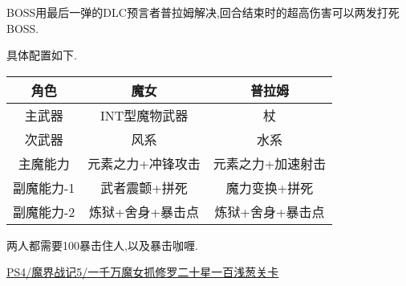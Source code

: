 	BOSS用最后一弹的DLC预言者普拉姆解决,回合结束时的超高伤害可以两发打死BOSS.

	具体配置如下.

	\begin{center}
		\begin{tabular}
		{| c | c | c |}
		\hline
		角色 & 魔女 & 普拉姆\\
		\hline
		主武器 & INT型魔物武器 & 杖\\
		\hline
		次武器 & 风系 & 水系 \\
		\hline
		主魔能力 & 元素之力+冲锋攻击 & 元素之力+加速射击\\
		\hline
		副魔能力-1 & 武者震颤+拼死 & 魔力变换+拼死\\
		\hline
		副魔能力-2 & 炼狱+舍身+暴击点 & 炼狱+舍身+暴击点\\
		\hline
		\end{tabular}
	\end{center}

	两人都需要100暴击住人,以及暴击咖喱.

	\href{http://www.bilibili.com/video/av3405842/}{PS4/魔界战记5/一千万魔女抓修罗二十星一百浅葱关卡}
